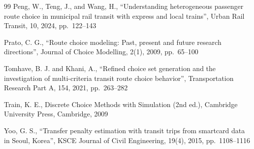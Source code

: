 \documentclass[12pt,a4paper]{article}
\begin{document}
\begin{thebibliography}{99}
Peng, W., Teng, J., and Wang, H., ``Understanding heterogeneous passenger route
choice in municipal rail transit with express and local trains'', Urban Rail
Transit, 10, 2024, pp.\ 122--143

Prato, C. G., ``Route choice modeling: Past, present and future research
directions'', Journal of Choice Modelling, 2(1), 2009, pp.\ 65--100

Tomhave, B. J. and Khani, A., ``Refined choice set generation and the
investigation of multi-criteria transit route choice behavior'', Transportation
Research Part A, 154, 2021, pp.\ 263--282

Train, K. E., Discrete Choice Methods with Simulation (2nd ed.), Cambridge
University Press, Cambridge, 2009

Yoo, G. S., ``Transfer penalty estimation with transit trips from smartcard
data in Seoul, Korea'', KSCE Journal of Civil Engineering, 19(4), 2015,
pp.\ 1108--1116

\end{thebibliography}
\end{document}
